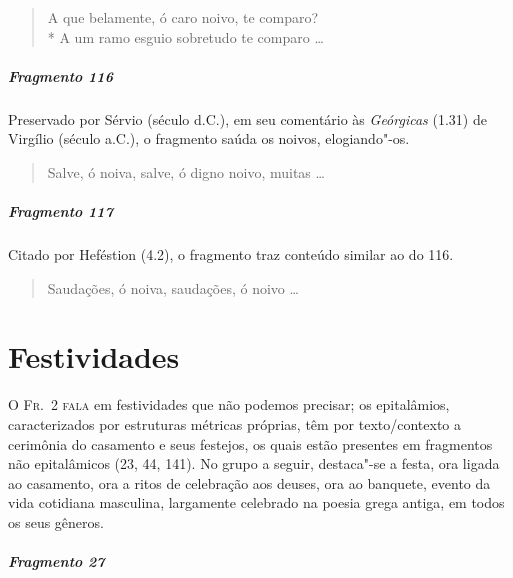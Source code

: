 {\begin{verse}
A que belamente, ó caro noivo, te comparo?\\*
A um ramo esguio sobretudo te comparo \ldots{}
\end{verse}

\paragraph{Fragmento 116}

{\small Preservado por Sérvio (século  d.C.), em seu comentário às \textit{Geórgicas} (1.31) de Virgílio (século  a.C.), o fragmento saúda os noivos, elogiando"-os.}

\begin{verse}
Salve, ó noiva, salve, ó digno noivo, muitas \ldots{}
\end{verse}

\paragraph{Fragmento 117}

{\small Citado por Heféstion (4.2), o fragmento traz conteúdo similar ao do 116.}

\begin{verse}
Saudações, ó noiva, saudações, ó noivo \ldots{}
\end{verse}

\chapter{Festividades}

\textsc{O Fr.~2 fala} em festividades que não podemos precisar; os epitalâmios,
caracterizados por estruturas métricas próprias, têm por texto/contexto a
cerimônia do casamento e seus festejos, os quais estão presentes em fragmentos não epitalâmicos (23, 44, 141). No grupo a seguir, destaca"-se a festa,
ora ligada ao casamento, ora a ritos de celebração aos deuses, ora ao banquete,
evento da vida cotidiana masculina, largamente celebrado na poesia grega
antiga, em todos os seus gêneros.

\paragraph{Fragmento 27}

}
